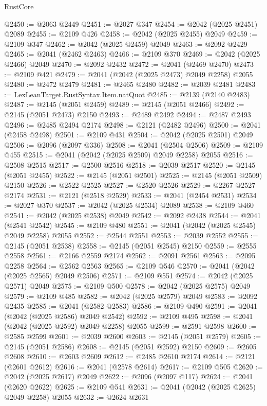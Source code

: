 \begin{lexlean}{RustCore}
\begin{coremodule}
@2450 := @2063 @2449
@2451 := @2027 @347
@2454 := @2042 (@2025 @2451) @2089
@2455 := @2109 @426
@2458 := @2042 (@2025 @2455) @2049
@2459 := @2109 @347
@2462 := @2042 (@2025 @2459) @2049
@2463 := @2092 @2429
@2465 := @2041 (@2462 @2463)
@2466 := @2109 @370
@2469 := @2042 (@2025 @2466) @2049
@2470 := @2092 @2432
@2472 := @2041 (@2469 @2470)
@2473 := @2109 @421
@2479 := @2041 (@2042 (@2025 @2473) @2049 @2258) @2055
@2480 := @2472 @2479
@2481 := @2465 @2480
@2482 := @2039 @2481
@2483 := LexLeanTarget.RustSyntax.Item.natQuot
@2485 := @2139 (@2140 @2483)
@2487 := @2145 (@2051 @2459)
@2489 := @2145 (@2051 @2466)
@2492 := @2145 (@2051 @2473) @2150
@2493 := @2489 @2492
@2494 := @2487 @2493
@2496 := @2485 @2494 @2174
@2498 := @2121 (@2482 @2496)
@2500 := @2041 (@2458 @2498)
@2501 := @2109 @431
@2504 := @2042 (@2025 @2501) @2049
@2506 := @2096 (@2097 @336)
@2508 := @2041 (@2504 @2506)
@2509 := @2109 @455
@2515 := @2041 (@2042 (@2025 @2509) @2049 @2258) @2055
@2516 := @2508 @2515
@2517 := @2500 @2516
@2518 := @2039 @2517
@2520 := @2145 (@2051 @2455)
@2522 := @2145 (@2051 @2501)
@2525 := @2145 (@2051 @2509) @2150
@2526 := @2522 @2525
@2527 := @2520 @2526
@2529 := @2267 @2527 @2174
@2531 := @2121 (@2518 @2529)
@2533 := @2041 (@2454 @2531)
@2534 := @2027 @370
@2537 := @2042 (@2025 @2534) @2089
@2538 := @2109 @460
@2541 := @2042 (@2025 @2538) @2049
@2542 := @2092 @2438
@2544 := @2041 (@2541 @2542)
@2545 := @2109 @480
@2551 := @2041 (@2042 (@2025 @2545) @2049 @2258) @2055
@2552 := @2544 @2551
@2553 := @2039 @2552
@2555 := @2145 (@2051 @2538)
@2558 := @2145 (@2051 @2545) @2150
@2559 := @2555 @2558
@2561 := @2166 @2559 @2174
@2562 := @2091 @2561
@2563 := @2095 @2258
@2564 := @2562 @2563
@2565 := @2109 @546
@2570 := @2041 (@2042 (@2025 @2565) @2049 @2506)
@2571 := @2109 @551
@2574 := @2042 (@2025 @2571) @2049
@2575 := @2109 @500
@2578 := @2042 (@2025 @2575) @2049
@2579 := @2109 @485
@2582 := @2042 (@2025 @2579) @2049
@2583 := @2092 @2435
@2585 := @2041 (@2582 @2583)
@2586 := @2109 @490
@2591 := @2041 (@2042 (@2025 @2586) @2049 @2542)
@2592 := @2109 @495
@2598 := @2041 (@2042 (@2025 @2592) @2049 @2258) @2055
@2599 := @2591 @2598
@2600 := @2585 @2599
@2601 := @2039 @2600
@2603 := @2145 (@2051 @2579)
@2605 := @2145 (@2051 @2586)
@2608 := @2145 (@2051 @2592) @2150
@2609 := @2605 @2608
@2610 := @2603 @2609
@2612 := @2485 @2610 @2174
@2614 := @2121 (@2601 @2612)
@2616 := @2041 (@2578 @2614)
@2617 := @2109 @505
@2620 := @2042 (@2025 @2617) @2049
@2622 := @2096 (@2097 @117)
@2624 := @2041 (@2620 @2622)
@2625 := @2109 @541
@2631 := @2041 (@2042 (@2025 @2625) @2049 @2258) @2055
@2632 := @2624 @2631

\end{coremodule}
\end{lexlean}
